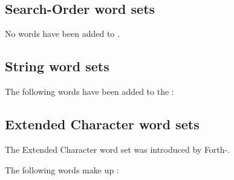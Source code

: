 \cbstart{}
\begin{minipage}[t]{0.45\linewidth}
	 \\
	\uline{} \\
	\uline{}\\
	\uline{} \\
\end{minipage}
\hfill
\begin{minipage}[t]{0.45\linewidth}
	 \\
	\uline{}\\
	 \\
\end{minipage}
\cbend
{}

\subsection{Search-Order word sets}
No words have been added to .

\subsection{String word sets}
The following words have been added to the :

\begin{minipage}[t]{0.3\linewidth}
\end{minipage}
\hfill
\begin{minipage}[t]{0.3\linewidth}
\end{minipage}
\hfill
\begin{minipage}[t]{0.3\linewidth}
\end{minipage}

\subsection{Extended Character word sets}
The Extended Character word set was introduced by Forth-\snapshot.

The following words make up :

